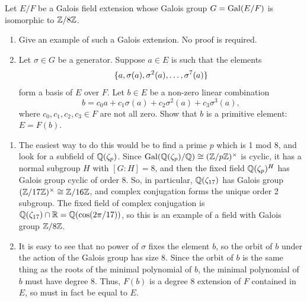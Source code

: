 %
\begin{question}[subtitle = August 2025 Problem 2,ID=Aug25_2]
Let $E/F$ be a Galois field extension whose Galois group $G = \operatorname{Gal}(E/F)$ is isomorphic to $\mathbb{Z}/8\mathbb{Z}$.
\begin{enumerate}
    \item Give an example of such a Galois extension. No proof is required.
    \item Let $\sigma \in G$ be a generator. Suppose $a \in E$ is such that the elements
    \[\{a,\sigma(a),\sigma^2(a),\dots,\sigma^7(a)\}\]
    form a basis of $E$ over $F$. Let $b \in E$ be a non-zero linear combination
    \[b = c_0 a + c_1 \sigma(a) + c_2 \sigma^2(a) + c_3 \sigma^3(a),\]
    where $c_0,c_1,c_2,c_3 \in F$ are not all zero. Show that $b$ is a primitive element: $E = F(b)$.
\end{enumerate}
\end{question}
\begin{solution}
\begin{enumerate}
    \item The easiest way to do this would be to find a prime $p$ which is 1 mod 8, and look for a subfield of $\mathbb{Q}(\zeta_p)$. Since $\operatorname{Gal}(\mathbb{Q}(\zeta_p)/\mathbb{Q}) \cong (\mathbb{Z}/p\mathbb{Z})^{\times}$ is cyclic, it has a normal subgroup $H$ with $[G:H] = 8$, and then the fixed field $\mathbb{Q}(\zeta_p)^H$ has Galois group cyclic of order 8. So, in particular, $\mathbb{Q}(\zeta_{17})$ has Galois group $(\mathbb{Z}/17\mathbb{Z})^{\times} \cong \mathbb{Z}/16\mathbb{Z}$, and complex conjugation forms the unique order 2 subgroup. The fixed field of complex conjugation is $\mathbb{Q}(\zeta_{17}) \cap \mathbb{R} = \mathbb{Q}(\cos(2\pi/17))$, so this is an example of a field with Galois group $\mathbb{Z}/8\mathbb{Z}$.
    \item It is easy to see that no power of $\sigma$ fixes the element $b$, so the orbit of $b$ under the action of the Galois group has size 8. Since the orbit of $b$ is the same thing as the roots of the minimal polynomial of $b$, the minimal polynomial of $b$ must have degree 8. Thus, $F(b)$ is a degree 8 extension of $F$ contained in $E$, so must in fact be equal to $E$.
\end{enumerate}
\end{solution}

